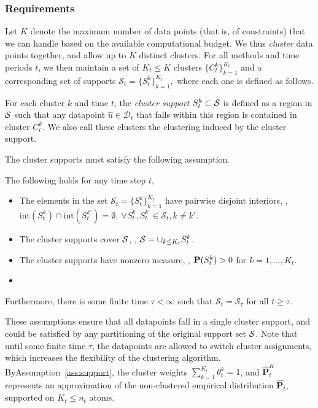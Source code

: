 \subsubsection{Requirements}
Let $K$ denote the maximum number of data points (that is, of constraints) that we can handle based on the available computational budget.
We thus {\it cluster} data points together, and allow up to $K$ distinct clusters. 
For all methods and time periods $t$, we then maintain a set of $K_t \leq K$ clusters $\{C_t^k\}_{k=1}^{K_t}$ and a corresponding set of supports $\mathcal{S}_t = \{S_t^k\}_{k=1}^{K_t},$  where each one is defined as follows.
\begin{definition}
\label{def:cluster_supp}
    For each cluster $k$ and time $t$, the {\it cluster support} $S_t^k \subset \mathcal{S}$ is defined as a region in $\mathcal{S}$ such that any datapoint $\hat{u} \in \mathcal{D}_t$ that falls within this region is contained in cluster $C_t^k$.
    We also call these clusters the clustering induced by the cluster support. 
\end{definition}
The cluster supports must satisfy the following assumption. 
\begin{assumption}
\label{ass:support}
The following holds for any time step $t$,
\begin{itemize}
    \item The elements in the set $\mathcal{S}_t = \{S_t^k\}_{k=1}^{K_t}$ have pairwise disjoint interiors, \ie, $ \mathrm{int}(S^k_t) \cap \mathrm{int}(S^{k'}_t) = \emptyset,~\forall S_t^k,S_t^{k'}\in \mathcal{S}_t, k \neq k'.$
    \item The cluster supports cover $\mathcal{S}$, \ie, $\mathcal{S}  = \cup_{k\leq K_t}S_t^k$.
    \item The cluster supports have nonzero measure, \ie, ${\mathbf P}(S^k_t) > 0$ for $k=1,\dots,K_t$.
    \item {}
\end{itemize}
Furthermore, there is some finite time $\tau < \infty$ such that $\mathcal{S}_t = \mathcal{S}_\tau$ for all $t \geq \tau$.
    \end{assumption}
 These assumptions ensure that all datapoints fall in a single cluster support, and could be satisfied by any partitioning of the original support set $\mathcal{S}$.  Note that until some finite time $\tau$, the datapoints are allowed to switch cluster assignments, which increases the flexibility of the clustering algorithm. 
ByAssumption~\ref{ass:support}, the cluster weights $\sum_{k=1}^{K_t}\theta^k_t = 1$, and $\hat{\mathbf{P}}^K_t$ represents an approximation of the non-clustered empirical distribution $\hat{\mathbf{P}}_t$, supported on $K_t \leq n_t$ atoms.


